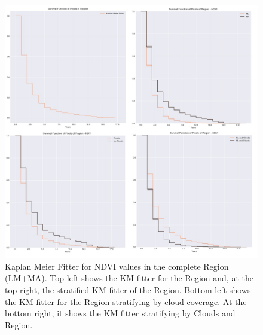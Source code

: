 \begin{figure}[H]
  \centering
  \includegraphics[width=1\textwidth]{KM_NDVI_complete.jpg}
\caption[Kaplan Meier Fitter for NDVI values in the complete Region ]{Kaplan Meier Fitter for NDVI values in the complete Region (LM+MA). Top left shows the KM fitter for the Region and, at the top right, the stratified KM fitter of the Region. Bottom left shows the KM fitter for the Region stratifying by cloud coverage. At the bottom right, it shows the KM fitter stratifying by Clouds and Region.}
\label{fig:km-total}
\end{figure}


